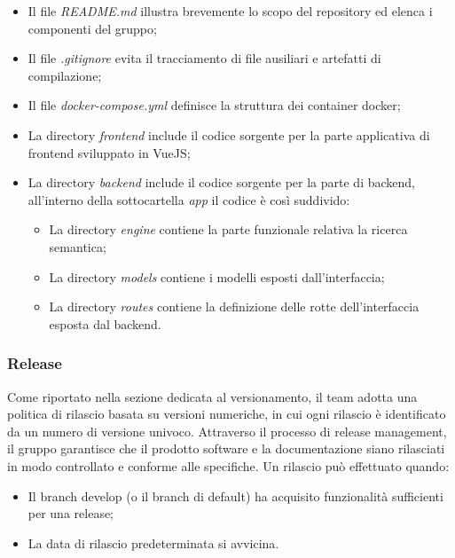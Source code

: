 \begin{itemize}
  \item Il file \emph{README.md} illustra brevemente lo scopo del repository ed elenca i componenti del gruppo;
  \item Il file \emph{.gitignore} evita il tracciamento di file ausiliari e artefatti di compilazione;
  \item Il file \emph{docker-compose.yml} definisce la struttura dei container docker;
  \item La directory \emph{frontend} include il codice sorgente per la parte applicativa di frontend sviluppato in VueJS;
  \item La directory \emph{backend} include il codice sorgente per la parte di backend, all'interno della sottocartella \emph{app} il codice è così suddivido:
  \begin{itemize}
    \item La directory \emph{engine} contiene la parte funzionale relativa la ricerca semantica;
    \item La directory \emph{models} contiene i modelli  esposti dall'interfaccia;
    \item La directory \emph{routes} contiene la definizione delle rotte dell'interfaccia esposta dal backend.
  \end{itemize}
\end{itemize}

\subsubsection{Release}
\par Come riportato nella sezione dedicata al versionamento, il team adotta una politica di rilascio basata su versioni numeriche, in cui ogni rilascio è identificato da un numero di versione univoco. Attraverso il processo di release management, il gruppo garantisce che il prodotto software e la documentazione siano rilasciati in modo controllato e conforme alle specifiche. Un rilascio può effettuato quando:
\begin{itemize}
  \item Il branch develop (o il branch di default) ha acquisito funzionalità sufficienti per una release;
  \item La data di rilascio predeterminata si avvicina.
\end{itemize}

